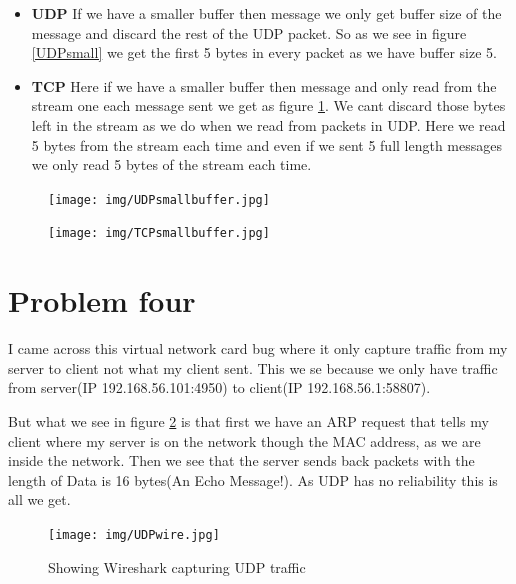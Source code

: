 \documentclass[a4paper,12pt]{article}
\numberwithin{figure}{section}
\begin{document}
\begin{itemize}
	\item \textbf{UDP} If we have a smaller buffer then message we only get buffer size of the message and discard the rest of the UDP packet. So as we see in figure \ref{UDPsmall} we get the first 5 bytes in every packet as we have buffer size 5. 
	
	\item \textbf{TCP} Here if we have a smaller buffer then message and only read from the stream one each message sent we get as figure \ref{TCPsmall}. We cant discard those bytes left in the stream as we do when we read from packets in UDP. Here we read 5 bytes from the stream each time and even if we sent 5 full length messages we only read 5 bytes of the stream each time. 
\end{itemize}

\begin{figure}[!h]
	\centering
	\begin{minipage}{.5\textwidth}
		\centering
		\texttt{[image: img/UDPsmallbuffer.jpg]}
		\label{UDPsmall}
	\end{minipage}%
	\begin{minipage}{.5\textwidth}
		\centering
		\texttt{[image: img/TCPsmallbuffer.jpg]}
		\label{TCPsmall}
	\end{minipage}
\end{figure}

\newpage

\section{Problem four}

I came across this virtual network card bug where it only capture traffic from my server to client not what my client sent. This we se because we only have traffic from server(IP 192.168.56.101:4950) to client(IP 192.168.56.1:58807).

But what we see in figure \ref{UDPwire} is that first we have an ARP request that tells my client where my server is on the network though the MAC address, as we are inside the network. Then we see that the server sends back packets with the length of Data is 16 bytes(An Echo Message!). As UDP has no reliability this is all we get.  


\begin{figure}[h!]
	\centering
	\texttt{[image: img/UDPwire.jpg]} 
	\caption{Showing Wireshark capturing UDP traffic}
	\label{UDPwire}
\end{figure}
\end{document}
